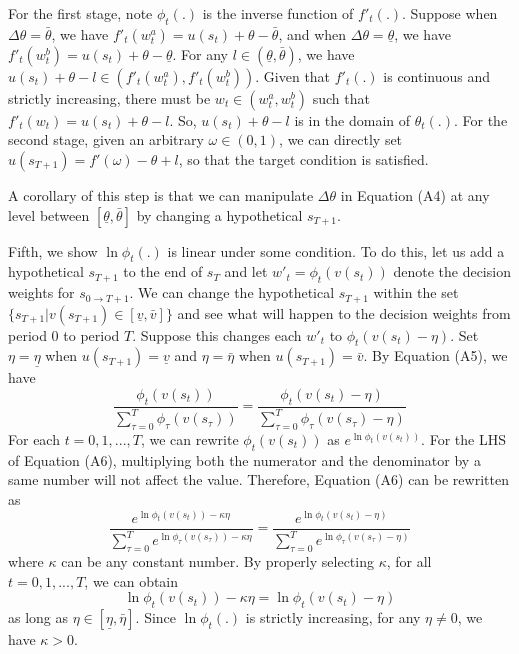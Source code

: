 \documentclass[
  12pt,
]{article}
\begin{document}
For the first stage, note \(\phi_t(.)\) is the inverse function of
\(f'_t(.)\). Suppose when \(\Delta\theta=\bar{\theta}\), we have
\(f'_t(w^{a}_t)=u(s_t)+\theta-\bar{\theta}\), and when
\(\Delta\theta=\underline{\theta}\), we have
\(f'_t(w^{b}_t)=u(s_t)+\theta-\underline{\theta}\). For any
\(l\in(\underline{\theta},\bar{\theta})\), we have
\(u(s_t)+\theta-l \in (f'_t(w^a_t),f'_t(w^b_t))\). Given that
\(f'_t(.)\) is continuous and strictly increasing, there must be
\(w_t\in(w^a_t,w^b_t)\) such that \(f'_t(w_t)=u(s_t)+\theta-l\). So,
\(u(s_t)+\theta-l\) is in the domain of \(\theta_t(.)\). For the second
stage, given an arbitrary \(\omega\in(0,1)\), we can directly set
\(u(s_{T+1})=f'(\omega)-\theta+l\), so that the target condition is
satisfied.

A corollary of this step is that we can manipulate \(\Delta \theta\) in
Equation (A4) at any level between \([\underline{\theta},\bar{\theta}]\)
by changing a hypothetical \(s_{T+1}\).

Fifth, we show \(\ln \phi_t(.)\) is linear under some condition. To do
this, let us add a hypothetical \(s_{T+1}\) to the end of \(s_T\) and
let \(w'_t=\phi_t(v(s_t))\) denote the decision weights for
\(s_{0\rightarrow T+1}\). We can change the hypothetical \(s_{T+1}\)
within the set \(\{s_{T+1}|v(s_{T+1})\in[\underline{v},\bar{v}]\}\) and
see what will happen to the decision weights from period 0 to period
\(T\). Suppose this changes each \(w'_t\) to \(\phi_t(v(s_t)-\eta)\).
Set \(\eta=\underline{\eta}\) when \(u(s_{T+1})=\underline{v}\) and
\(\eta=\bar{\eta}\) when \(u(s_{T+1})=\bar{v}\). By Equation (A5), we
have\[\tag{A6}
\frac{\phi_t(v(s_t))}{\sum_{\tau=0}^{T}\phi_\tau(v(s_\tau))} = \frac{\phi_t(v(s_t)-\eta)}{\sum_{\tau=0}^{T}\phi_\tau(v(s_\tau)-\eta)}
\]For each \(t=0,1,...,T\), we can rewrite \(\phi_t(v(s_t))\) as
\(e^{\ln \phi_t(v(s_t))}\). For the LHS of Equation (A6), multiplying
both the numerator and the denominator by a same number will not affect
the value. Therefore, Equation (A6) can be rewritten as \[
\frac{e^{\ln\phi_t(v(s_t))-\kappa\eta}}{\sum_{\tau=0}^{T}e^{\ln\phi_\tau(v(s_\tau))-\kappa\eta}} = \frac{e^{\ln\phi_t(v(s_t)-\eta)}}{\sum_{\tau=0}^{T}e^{\ln\phi_\tau(v(s_\tau)-\eta)}}
\]where \(\kappa\) can be any constant number. By properly selecting
\(\kappa\), for all \(t=0,1,...,T\), we can obtain\[\tag{A7}
\ln \phi_t(v(s_t))-\kappa\eta=\ln \phi_t(v(s_t)-\eta)
\]as long as \(\eta \in [\underline{\eta},\bar{\eta}]\). Since
\(\ln\phi_t(.)\) is strictly increasing, for any \(\eta\neq 0\), we have
\(\kappa>0\).
\end{document}
